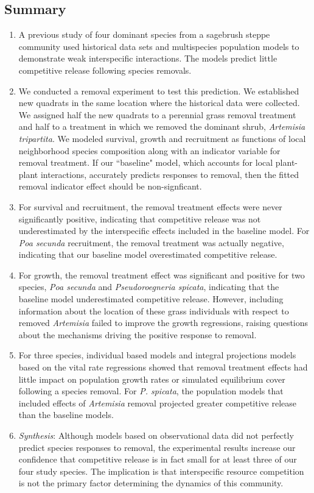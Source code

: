 \documentclass[11pt]{article}
\begin{document}
\begin{doublespacing} 

\linenumbers

\section*{Summary}

\begin{enumerate}
\item A previous study of four dominant species from a sagebrush steppe community used historical data sets and multispecies population models to demonstrate weak interspecific interactions. The models predict little competitive release following species removals.
\item We conducted a removal experiment to test this prediction. We established new quadrats in the same location where the historical data were collected. We assigned half the new quadrats to a  perennial grass removal treatment and half to a treatment in which we removed the dominant shrub, \textit{Artemisia tripartita}. We modeled survival, growth and recruitment as functions of local neighborhood species composition along with an indicator variable for removal treatment. If our ``baseline" model, which accounts for local plant-plant interactions, accurately predicts responses to removal, then the fitted removal indicator effect should be non-signficant.
\item  For survival and recruitment, the removal treatment effects were never significantly positive, indicating that competitive release was not underestimated by the interspecific effects included in the baseline model. For  \textit{Poa secunda} recruitment, the removal treatment was actually negative, indicating that our baseline model overestimated competitive release.
\item For growth, the removal treatment effect was significant and positive for two species, \textit{Poa secunda} and \textit{Pseudoroegneria spicata}, indicating that the baseline model underestimated competitive release. However, including information about the location of these grass individuals with respect to removed \textit{Artemisia} failed to improve the growth regressions, raising questions about the mechanisms driving the positive response to removal.
\item For three species, individual based models and integral projections models based on the vital rate regressions showed that removal treatment effects had little impact on population growth rates or simulated equilibrium cover following a species removal. For \textit{P. spicata}, the population models that included effects of \textit{Artemisia} removal projected greater competitive release than the baseline models. 
\item \emph{Synthesis}: Although models based on observational data did not perfectly predict species responses to removal, the experimental results increase our confidence that competitive release is in fact small for at least three of our four study species. The implication is that interspecific resource competition is not the primary factor determining the dynamics of this community.


\end{enumerate}
\end{doublespacing}
\end{document}
